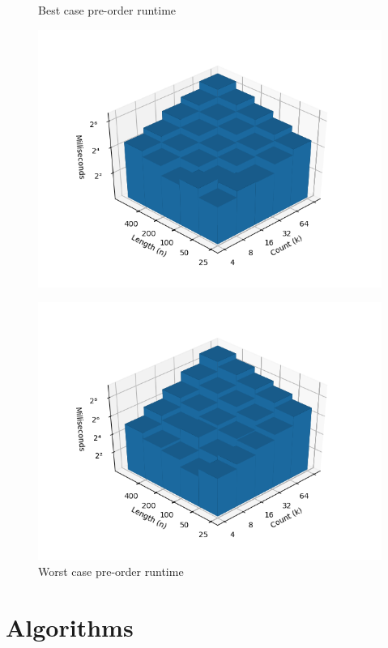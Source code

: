 \documentclass{bmcart}
\begin{document}
\begin{backmatter}
\begin{figure}[h]
		\begin{minipage}{0.48\textwidth}
			\centering
			\caption{Best case pre-order runtime}
			\label{Fig:Best}
			\includegraphics[width=1.1\textwidth]{pathological-12-preorder.png}
		\end{minipage}
		\hfill
		\begin{minipage}{0.48\textwidth}
			\centering
			\caption{Worst case pre-order runtime}
			\label{Fig:Worst}
			\includegraphics[width=1.1\textwidth]{pathological-31-preorder.png}
		\end{minipage}
	\end{figure}
	
	\section*{Algorithms}
	

\end{backmatter}
\end{document}
